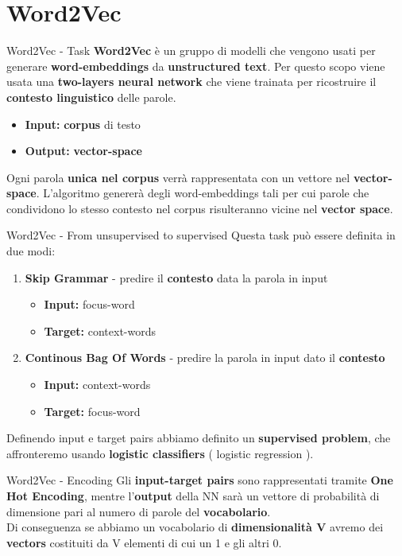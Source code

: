 \documentclass[british]{beamer}
\begin{document}
\section{Word2Vec}

\begin{frame}{Word2Vec - Task}
	\textbf{Word2Vec} \`{e} un gruppo di modelli che vengono usati per generare \textbf{word-embeddings} da \textbf{unstructured text}. Per questo scopo viene usata una \textbf{\alert{two-layers neural network}} che viene trainata per ricostruire il \textbf{contesto linguistico} delle parole.
	\begin{itemize}
		\item \textbf{Input: }\textbf{corpus} di testo
		\item \textbf{Output: }\textbf{vector-space}
	\end{itemize}
	Ogni parola \textbf{unica nel corpus} verr\`{a} rappresentata con un vettore nel \textbf{vector-space}.
	L'algoritmo generer\`{a} degli word-embeddings tali per cui parole che condividono lo stesso contesto nel corpus risulteranno vicine nel \textbf{vector space}.
\end{frame}

\begin{frame}{Word2Vec - From unsupervised to supervised}
	Questa task pu\`{o} essere definita in due modi:
	\begin{enumerate}
		\item \textbf{Skip Grammar} - predire il \textbf{contesto} data la parola in input
		\begin{itemize}
			\item \textbf{Input: }focus-word
			\item \textbf{Target: }context-words
		\end{itemize}
		\item \textbf{Continous Bag Of Words} - predire la parola in input dato il \textbf{contesto}
		\begin{itemize}
			\item \textbf{Input: }context-words
			\item \textbf{Target: }focus-word
		\end{itemize}
	\end{enumerate}
	Definendo input e target pairs abbiamo definito un \textbf{supervised problem}, che affronteremo usando \textbf{logistic classifiers} ( logistic regression ).
\end{frame}

\begin{frame}{Word2Vec - Encoding}
	Gli \textbf{input-target pairs} sono rappresentati tramite \textbf{One Hot Encoding}, mentre l'\textbf{output} della NN sar\`{a} un vettore di probabilit\`{a} di dimensione pari al numero di parole del \textbf{vocabolario}.\\
	Di conseguenza se abbiamo un vocabolario di \textbf{dimensionalit\`{a} V} avremo dei \textbf{vectors} costituiti da V elementi di cui un 1 e gli altri 0.
\end{frame}
\end{document}
